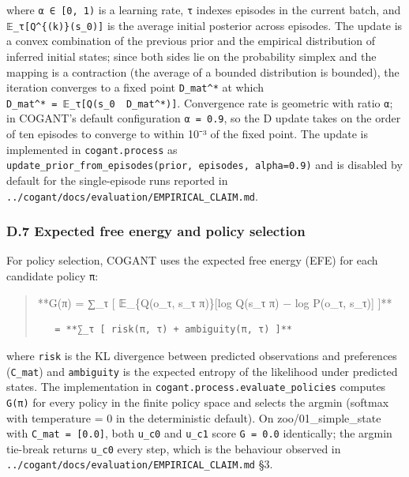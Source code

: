 \documentclass[
]{article}
\begin{document}
where \texttt{α\ ∈\ {[}0,\ 1)} is a learning rate, \texttt{τ} indexes
episodes in the current batch, and \texttt{𝔼\_τ{[}Q\^{}\{(k)\}(s\_0){]}}
is the average initial posterior across episodes. The update is a convex
combination of the previous prior and the empirical distribution of
inferred initial states; since both sides lie on the probability simplex
and the mapping is a contraction (the average of a bounded distribution
is bounded), the iteration converges to a fixed point
\texttt{D\_mat\^{}*} at which
\texttt{D\_mat\^{}*\ =\ 𝔼\_τ{[}Q(s\_0\ \mid{}\ D\_mat\^{}*){]}}.
Convergence rate is geometric with ratio \texttt{α}; in COGANT's default
configuration \texttt{α\ =\ 0.9}, so the D update takes on the order of
ten episodes to converge to within 10⁻³ of the fixed point. The update
is implemented in \texttt{cogant.process} as
\texttt{update\_prior\_from\_episodes(prior,\ episodes,\ alpha=0.9)} and
is disabled by default for the single-episode runs reported in
\texttt{../cogant/docs/evaluation/EMPIRICAL\_CLAIM.md}.

\subsubsection{D.7 Expected free energy and policy
selection}\label{d.7-expected-free-energy-and-policy-selection}

For policy selection, COGANT uses the expected free energy (EFE) for
each candidate policy \texttt{π}:

\begin{quote}
**G(π) = ∑\_τ {[} 𝔼\_\{Q(o\_τ, s\_τ \mid{} π)\}{[}log Q(s\_τ
\mid{} π) − log P(o\_τ, s\_τ){]} {]}**

\begin{verbatim}
   = **∑_τ [ risk(π, τ) + ambiguity(π, τ) ]**
\end{verbatim}
\end{quote}

where \texttt{risk} is the KL divergence between predicted observations
and preferences (\texttt{C\_mat}) and \texttt{ambiguity} is the expected
entropy of the likelihood under predicted states. The implementation in
\texttt{cogant.process.evaluate\_policies} computes \texttt{G(π)} for
every policy in the finite policy space and selects the argmin (softmax
with temperature = 0 in the deterministic default). On
zoo/01\_simple\_state with \texttt{C\_mat\ =\ {[}0.0{]}}, both
\texttt{u\_c0} and \texttt{u\_c1} score \texttt{G\ =\ 0.0} identically;
the argmin tie-break returns \texttt{u\_c0} every step, which is the
behaviour observed in
\texttt{../cogant/docs/evaluation/EMPIRICAL\_CLAIM.md} §3.
\end{document}
